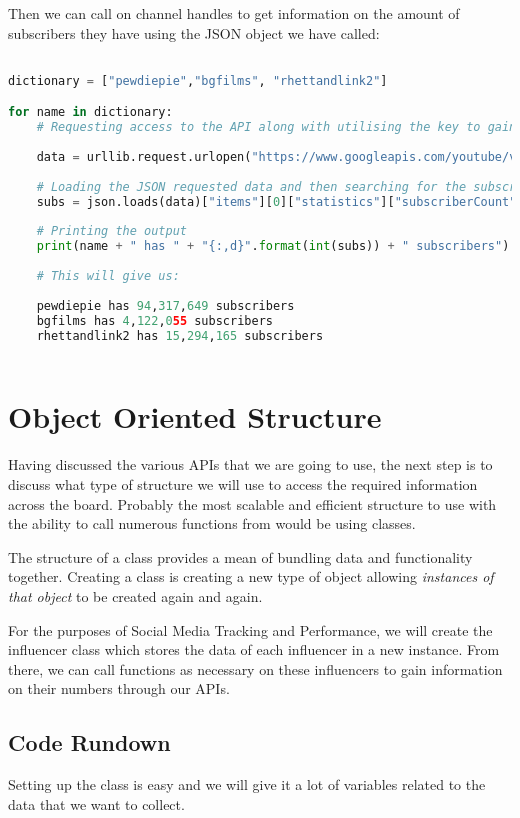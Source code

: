 \documentclass[12pt, letterpaper]{article}
\begin{document}
Then we can call on channel handles to get information on the amount of subscribers they have using the JSON object we have called:

\begin{lstlisting}[language=python]

dictionary = ["pewdiepie","bgfilms", "rhettandlink2"]

for name in dictionary:
	# Requesting access to the API along with utilising the key to gain access
    
    data = urllib.request.urlopen("https://www.googleapis.com/youtube/v3/channels?part=statistics&forUsername="+name+"&key="+key).read()
    
    # Loading the JSON requested data and then searching for the subscriber count
    subs = json.loads(data)["items"][0]["statistics"]["subscriberCount"]
   
    # Printing the output
    print(name + " has " + "{:,d}".format(int(subs)) + " subscribers")
    
    # This will give us:
   
    pewdiepie has 94,317,649 subscribers
	bgfilms has 4,122,055 subscribers
	rhettandlink2 has 15,294,165 subscribers
    
\end{lstlisting}

\section{Object Oriented Structure}
Having discussed the various APIs that we are going to use, the next step is to discuss what type of structure we will use to access the required information across the board. Probably the most scalable and efficient structure to use with the ability to call numerous functions from would be using classes.

The structure of a class provides a mean of bundling data and functionality together. Creating a class is creating a new type of object allowing \textit{instances of that object} to be created again and again.

For the purposes of Social Media Tracking and Performance, we will create the influencer class which stores the data of each influencer in a new instance. From there, we can call functions as necessary on these influencers to gain information on their numbers through our APIs.

\subsection{Code Rundown}
Setting up the class is easy and we will give it a lot of variables related to the data that we want to collect.
\end{document}
